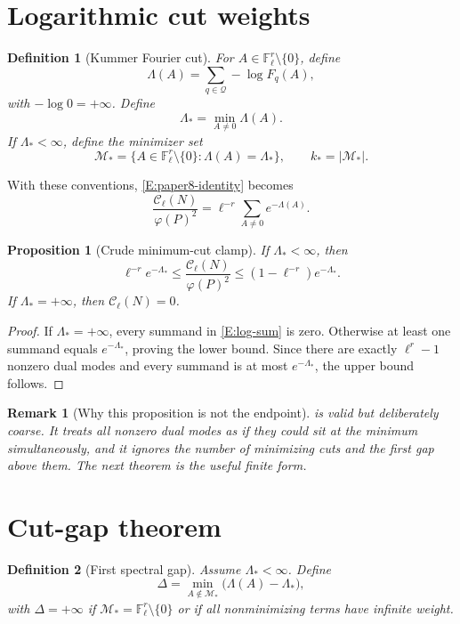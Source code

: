 \documentclass[11pt]{article}
\newtheorem{proposition}{Proposition}
\newtheorem{definition}{Definition}
\newtheorem{remark}{Remark}
\newcommand{\F}{\mathbb F}
\begin{document}
\section{Logarithmic cut weights}

\begin{definition}[Kummer Fourier cut]
For \(A\in\F_\ell^r\setminus\{0\}\), define
\[
\Lambda(A)=\sum_{q\in\mathcal Q}-\log F_q(A),
\]
with \(-\log0=+\infty\).  Define
\[
\Lambda_*=\min_{A\ne0}\Lambda(A).
\]
If \(\Lambda_*<\infty\), define the minimizer set
\[
\mathcal M_*=\{A\in\F_\ell^r\setminus\{0\}:\Lambda(A)=\Lambda_*\},
\qquad
k_*=|\mathcal M_*|.
\]
\end{definition}

With these conventions, \eqref{E:paper8-identity} becomes
\begin{equation}\label{E:log-sum}
\frac{\mathcal C_\ell(N)}{\varphi(P)^2}
=
\ell^{-r}\sum_{A\ne0}e^{-\Lambda(A)}.
\end{equation}

\begin{proposition}[Crude minimum-cut clamp]\label{P:crude}
If \(\Lambda_*<\infty\), then
\[
\ell^{-r}e^{-\Lambda_*}
\le
\frac{\mathcal C_\ell(N)}{\varphi(P)^2}
\le
(1-\ell^{-r})e^{-\Lambda_*}.
\]
If \(\Lambda_*=+\infty\), then \(\mathcal C_\ell(N)=0\).
\end{proposition}

\begin{proof}
If \(\Lambda_*=+\infty\), every summand in \eqref{E:log-sum} is zero.  Otherwise at least one summand equals \(e^{-\Lambda_*}\), proving the lower bound.  Since there are exactly \(\ell^r-1\) nonzero dual modes and every summand is at most \(e^{-\Lambda_*}\), the upper bound follows.
\end{proof}

\begin{remark}[Why this proposition is not the endpoint]
 is valid but deliberately coarse.  It treats all nonzero dual modes as if they could sit at the minimum simultaneously, and it ignores the number of minimizing cuts and the first gap above them.  The next theorem is the useful finite form.
\end{remark}

\section{Cut-gap theorem}

\begin{definition}[First spectral gap]
Assume \(\Lambda_*<\infty\).  Define
\[
\Delta=
\min_{A\notin\mathcal M_*}\bigl(\Lambda(A)-\Lambda_*\bigr),
\]
with \(\Delta=+\infty\) if \(\mathcal M_*=\F_\ell^r\setminus\{0\}\) or if all nonminimizing terms have infinite weight.
\end{definition}
\end{document}
